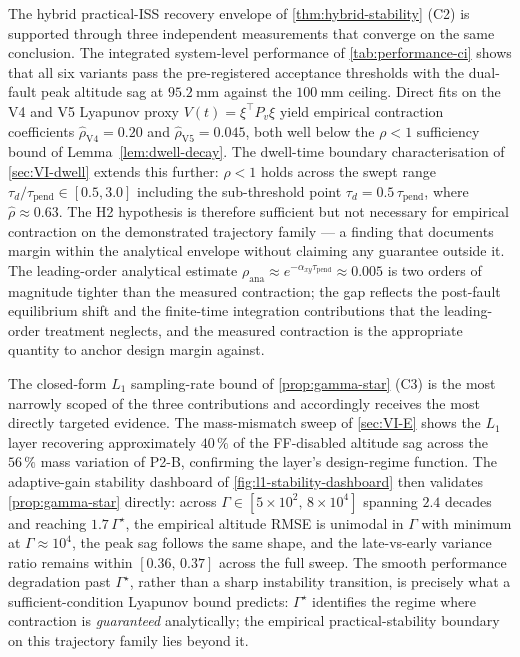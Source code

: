 The hybrid practical-ISS recovery envelope of \cref{thm:hybrid-stability} (C2) is supported through three independent measurements that converge on the same conclusion. The integrated system-level performance of \cref{tab:performance-ci} shows that all six variants pass the pre-registered acceptance thresholds with the dual-fault peak altitude sag at $\SI{95.2}{\milli\metre}$ against the $\SI{100}{\milli\metre}$ ceiling. Direct fits on the V4 and V5 Lyapunov proxy $V(t)=\xi^{\top}P_v\xi$ yield empirical contraction coefficients $\hat{\rho}_{\mathrm{V4}}=0.20$ and $\hat{\rho}_{\mathrm{V5}}=0.045$, both well below the $\rho<1$ sufficiency bound of Lemma~\ref{lem:dwell-decay}. The dwell-time boundary characterisation of \cref{sec:VI-dwell} extends this further: $\hat{\rho}<1$ holds across the swept range $\tau_d/\tau_{\mathrm{pend}}\in[0.5,3.0]$ including the sub-threshold point $\tau_d=0.5\,\tau_{\mathrm{pend}}$, where $\hat{\rho}\approx 0.63$. The H2 hypothesis is therefore sufficient but not necessary for empirical contraction on the demonstrated trajectory family --- a finding that documents margin within the analytical envelope without claiming any guarantee outside it. The leading-order analytical estimate $\rho_{\mathrm{ana}}\approx e^{-\alpha_{xy}\tau_{\mathrm{pend}}} \approx 0.005$ is two orders of magnitude tighter than the measured contraction; the gap reflects the post-fault equilibrium shift and the finite-time integration contributions that the leading-order treatment neglects, and the measured contraction is the appropriate quantity to anchor design margin against.

The closed-form $L_1$ sampling-rate bound of \cref{prop:gamma-star} (C3) is the most narrowly scoped of the three contributions and accordingly receives the most directly targeted evidence. The mass-mismatch sweep of \cref{sec:VI-E} shows the $L_1$ layer recovering approximately $40\,\%$ of the FF-disabled altitude sag across the $56\,\%$ mass variation of P2-B, confirming the layer's design-regime function. The adaptive-gain stability dashboard of \cref{fig:l1-stability-dashboard} then validates \cref{prop:gamma-star} directly: across $\Gamma\in [5\!\times\!10^{2},\,8\!\times\!10^{4}]$ spanning $2.4$ decades and reaching $1.7\,\Gamma^{\star}$, the empirical altitude RMSE is unimodal in $\Gamma$ with minimum at $\Gamma\approx 10^{4}$, the peak sag follows the same shape, and the late-vs-early variance ratio remains within $[0.36,\,0.37]$ across the full sweep. The smooth performance degradation past $\Gamma^{\star}$, rather than a sharp instability transition, is precisely what a sufficient-condition Lyapunov bound predicts: $\Gamma^{\star}$ identifies the regime where contraction is \emph{guaranteed} analytically; the empirical practical-stability boundary on this trajectory family lies beyond it.

